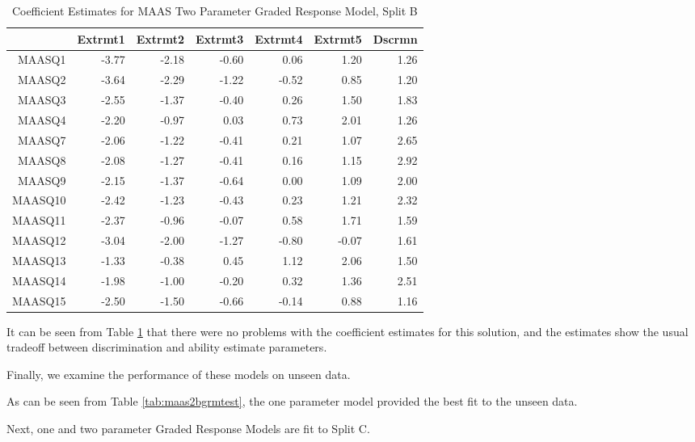 \documentclass{article}
\begin{document}
\begin{table}[ht]
\centering
\begin{tabular}{rrrrrrr}
  \hline
 & Extrmt1 & Extrmt2 & Extrmt3 & Extrmt4 & Extrmt5 & Dscrmn \\ 
  \hline
MAASQ1 & -3.77 & -2.18 & -0.60 & 0.06 & 1.20 & 1.26 \\ 
  MAASQ2 & -3.64 & -2.29 & -1.22 & -0.52 & 0.85 & 1.20 \\ 
  MAASQ3 & -2.55 & -1.37 & -0.40 & 0.26 & 1.50 & 1.83 \\ 
  MAASQ4 & -2.20 & -0.97 & 0.03 & 0.73 & 2.01 & 1.26 \\ 
  MAASQ7 & -2.06 & -1.22 & -0.41 & 0.21 & 1.07 & 2.65 \\ 
  MAASQ8 & -2.08 & -1.27 & -0.41 & 0.16 & 1.15 & 2.92 \\ 
  MAASQ9 & -2.15 & -1.37 & -0.64 & 0.00 & 1.09 & 2.00 \\ 
  MAASQ10 & -2.42 & -1.23 & -0.43 & 0.23 & 1.21 & 2.32 \\ 
  MAASQ11 & -2.37 & -0.96 & -0.07 & 0.58 & 1.71 & 1.59 \\ 
  MAASQ12 & -3.04 & -2.00 & -1.27 & -0.80 & -0.07 & 1.61 \\ 
  MAASQ13 & -1.33 & -0.38 & 0.45 & 1.12 & 2.06 & 1.50 \\ 
  MAASQ14 & -1.98 & -1.00 & -0.20 & 0.32 & 1.36 & 2.51 \\ 
  MAASQ15 & -2.50 & -1.50 & -0.66 & -0.14 & 0.88 & 1.16 \\ 
   \hline
\end{tabular}
\caption{Coefficient Estimates for MAAS Two Parameter Graded Response Model, Split B} 
\label{tab:maas2bgrm2pl}
\end{table}
It can be seen from Table \ref{tab:maas2bgrm2pl} that there were no problems with the coefficient estimates for this solution, and the estimates show the usual tradeoff between discrimination and ability estimate parameters. 

Finally, we examine the performance of these models on unseen data.



As can be seen from Table \ref{tab:maas2bgrmtest}, the one parameter model provided the best fit to the unseen data. 

Next, one and two parameter Graded Response Models are fit to Split C.
\end{document}
